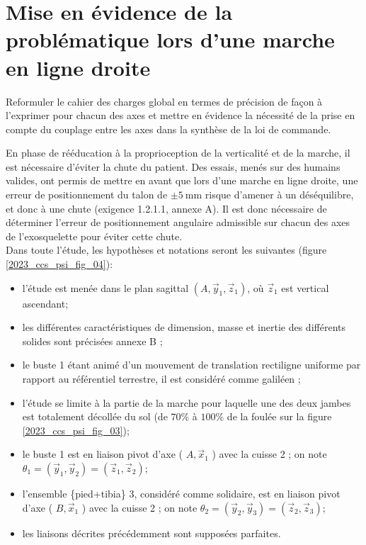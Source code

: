 

\section{Mise en évidence de la problématique lors d'une marche en ligne droite}
\begin{obj}
Reformuler le cahier des charges global en termes de précision de façon à l'exprimer pour chacun des axes et mettre en évidence la nécessité de la prise en compte du couplage entre les axes dans la synthèse de la loi de commande.
\end{obj}

En phase de rééducation à la proprioception de la verticalité et de la marche, il est nécessaire d'éviter la chute du patient. Des essais, menés sur des humains valides, ont permis de mettre en avant que lors d'une marche en ligne droite, une erreur de positionnement du talon de $\pm 5 \mathrm{~mm}$ risque d'amener à un déséquilibre, et donc à une chute (exigence 1.2.1.1, annexe A). Il est donc nécessaire de déterminer l'erreur de positionnement angulaire admissible sur chacun des axes de l'exosquelette pour éviter cette chute.\\
Dans toute l'étude, les hypothèses et notations seront les suivantes (figure \ref{2023_ccs_psi_fig_04}):

\begin{itemize}
  \item l'étude est menée dans le plan sagittal $\left(A, \vec{y}_{1}, \vec{z}_{1}\right)$, où $\vec{z}_{1}$ est vertical ascendant;
  \item les différentes caractéristiques de dimension, masse et inertie des différents solides sont précisées annexe B ;
  \item le buste 1 étant animé d'un mouvement de translation rectiligne uniforme par rapport au référentiel terrestre, il est considéré comme galiléen ;
  \item l'étude se limite à la partie de la marche pour laquelle une des deux jambes est totalement décollée du sol (de $70 \%$ à $100 \%$ de la foulée sur la figure \ref{2023_ccs_psi_fig_03});
  \item le buste 1 est en liaison pivot d'axe ( $A, \vec{x}_{1}$ ) avec la cuisse 2 ; on note $\theta_{1}=\left(\vec{y}_{1}, \vec{y}_{2}\right)=\left(\vec{z}_{1}, \vec{z}_{2}\right)$;
  \item l'ensemble \{pied+tibia\} 3, considéré comme solidaire, est en liaison pivot d'axe ( $B, \vec{x}_{1}$ ) avec la cuisse 2 ; on note $\theta_{2}=\left(\vec{y}_{2}, \vec{y}_{3}\right)=\left(\vec{z}_{2}, \vec{z}_{3}\right)$;
  \item les liaisons décrites précédemment sont supposées parfaites.\\
\end{itemize}


